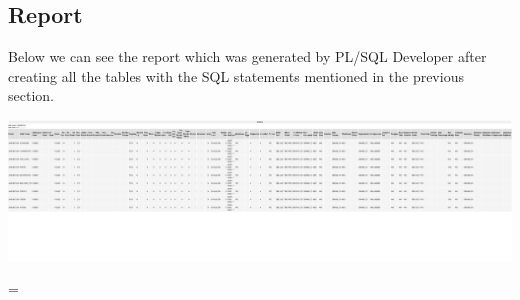 \subsection{Report}

Below we can see the report which was generated by PL/SQL Developer after creating all the tables with the SQL statements mentioned in the previous section.

\newlength{\classpagewidth}
\setlength{\classpagewidth}{\pdfpagewidth}
\eject
\pdfpagewidth=115cm
\includegraphics[page=1]{images/report.pdf}

\eject
\pdfpagewidth=\classpagewidth